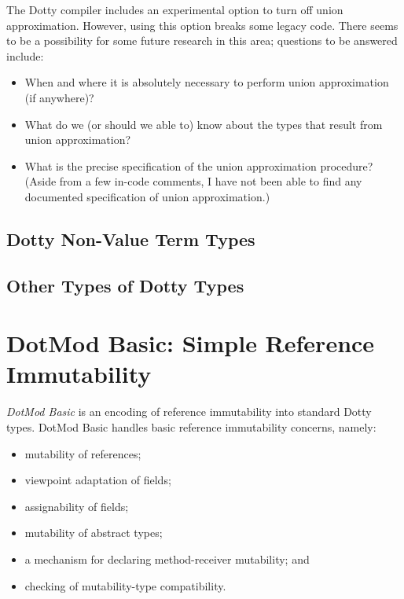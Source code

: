 \documentclass[11pt]{report}
\begin{document}
The Dotty compiler includes an experimental option to turn off union approximation. However, using this option breaks some legacy code. There seems to be a possibility for some future research in this area; questions to be answered include:
\begin{itemize}
\item When and where it is absolutely necessary to perform union approximation (if anywhere)?
\item What do we (or should we able to) know about the types that result from union approximation?
\item What is the precise specification of the union approximation procedure? (Aside from a few in-code comments, I have not been able to find any documented specification of union approximation.)
\end{itemize}


\section{Dotty Non-Value Term Types} \label{sec:nonvalue-term-types}



\section{Other Types of Dotty Types}






\chapter{DotMod Basic: Simple Reference Immutability}


{\em DotMod Basic} is an encoding of reference immutability into standard Dotty types.
DotMod Basic handles basic reference immutability concerns, namely:
\begin{itemize}
\item mutability of references;
\item viewpoint adaptation of fields;
\item assignability of fields;
\item mutability of abstract types;
\item a mechanism for declaring method-receiver mutability; and
\item checking of mutability-type compatibility.
\end{itemize}
\end{document}
